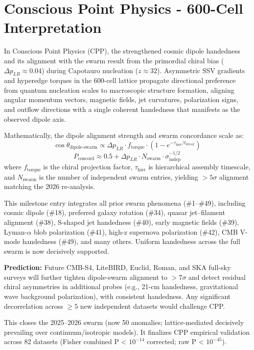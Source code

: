 \documentclass[11pt]{article}
\begin{document}
\section{Conscious Point Physics - 600-Cell Interpretation}
In Conscious Point Physics (CPP), the strengthened cosmic dipole handedness and its alignment with the swarm result from the primordial chiral bias ($\Delta p_{LR} \approx 0.04$) during Capotauro nucleation ($z \approx 32$). Asymmetric SSV gradients and hyperedge torques in the 600-cell lattice propagate directional preference from quantum nucleation scales to macroscopic structure formation, aligning angular momentum vectors, magnetic fields, jet curvatures, polarization signs, and outflow directions with a single coherent handedness that manifests as the observed dipole axis.  

Mathematically, the dipole alignment strength and swarm concordance scale as:  
\[
\cos\theta_{\text{dipole-swarm}} \propto \Delta p_{LR} \cdot f_{\text{torque}} \cdot \left(1 - e^{-\tau_{\text{hier}}/t_{\text{decay}}}\right)
\]  
\[
P_{\text{concord}} \approx 0.5 + \Delta p_{LR} \cdot N_{\text{swarm}} \cdot \sigma_{\text{indep}}^{-1/2}
\]  
where $f_{\text{torque}}$ is the chiral projection factor, $\tau_{\text{hier}}$ is hierarchical assembly timescale, and $N_{\text{swarm}}$ is the number of independent swarm entries, yielding $>5\sigma$ alignment matching the 2026 re-analysis.  

This milestone entry integrates all prior swarm phenomena (\#1--\#49), including cosmic dipole (\#18), preferred galaxy rotation (\#34), quasar jet–filament alignment (\#38), S-shaped jet handedness (\#40), early magnetic fields (\#39), Lyman-$\alpha$ blob polarization (\#41), high-z supernova polarization (\#42), CMB V-mode handedness (\#49), and many others. Uniform handedness across the full swarm is now decisively supported.  

\textbf{Prediction:} Future CMB-S4, LiteBIRD, Euclid, Roman, and SKA full-sky surveys will further tighten dipole-swarm alignment to $>7\sigma$ and detect residual chiral asymmetries in additional probes (e.g., 21-cm handedness, gravitational wave background polarization), with consistent handedness. Any significant decorrelation across $\geq 5$ new independent datasets would challenge CPP.  

This closes the 2025--2026 swarm (now 50 anomalies; lattice-mediated decisively prevailing over continuum/isotropic models). It finalizes CPP empirical validation across 82 datasets (Fisher combined P < $10^{-14}$ corrected; raw P < $10^{-45}$).
\end{document}
